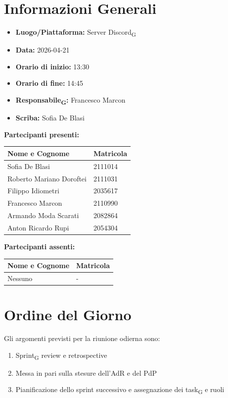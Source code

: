 \section{Informazioni Generali}
\begin{itemize}
	\item \textbf{Luogo/Piattaforma:} {Server Discord\textsubscript{G}}
	\item \textbf{Data:} 2026-04-21
	\item \textbf{Orario di inizio:} 13:30
	\item \textbf{Orario di fine:} 14:45
	\item \textbf{Responsabile\textsubscript{G}:} {Francesco Marcon}
	\item \textbf{Scriba:} {Sofia De Blasi}
\end{itemize}

\vspace{0.5cm}
\textbf{Partecipanti presenti:}
\begin{table}[ht]
	\centering
	\renewcommand{\arraystretch}{1.2}
	\begin{tabularx}{\textwidth}{X l}
		\toprule
		\textbf{Nome e Cognome} & \textbf{Matricola} \\
		\midrule
		Sofia De Blasi & 2111014 \\
		Roberto Mariano Doroftei & 2111031 \\
		Filippo Idiometri & 2035617 \\
		Francesco Marcon & 2110990 \\
		Armando Moda Scarati & 2082864 \\
		Anton Ricardo Rupi & 2054304 \\
		\bottomrule
	\end{tabularx}
\end{table}

\vspace{0.5cm}
\textbf{Partecipanti assenti:}
\begin{table}[ht]
	\centering
	\renewcommand{\arraystretch}{1.2}
	\begin{tabularx}{\textwidth}{X l}
		\toprule
		\textbf{Nome e Cognome} & \textbf{Matricola} \\
		\midrule
		Nessuno & - \\
		\bottomrule
	\end{tabularx}
\end{table}

\section{Ordine del Giorno}
Gli argomenti previsti per la riunione odierna sono:
\begin{enumerate}
	\item Sprint\textsubscript{G} review e retrospective
	\item Messa in pari sulla stesure dell'AdR e del PdP
	\item Pianificazione dello sprint successivo e assegnazione dei task\textsubscript{G} e ruoli
\end{enumerate}

